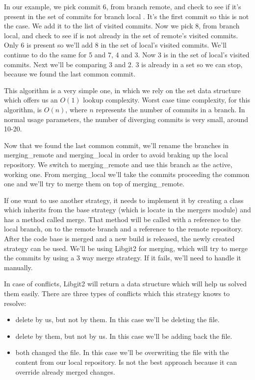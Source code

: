 In our example, we pick commit 6, from branch remote, and check to see if it's present in the set of commits for branch local . It's the first commit so this is not the case. We add it to the list of visited commits. Now we pick 8, from branch local, and check to see if is not already in the set of remote's  visited commits.
Only 6 is present so we'll add 8 in the set of local's visited commits. We'll continue to do the same for 5 and 7, 4 and 3. Now 3 is in the set of local's visited commits. Next we'll be comparing 3 and 2. 3 is already in a set so we can stop, because we found the last common commit.

This algorithm is a very simple one, in which we rely on the set data structure which offers us an $O(1)$ lookup complexity. Worst case time complexity, for this algorithm, is $O(n)$, where $n$ represents the number of commits in a branch. In normal usage parameters, the number of diverging commits is very small, around 10-20.

Now that we found the last common commit, we'll rename the branches in merging\_remote and merging\_local in order to avoid braking up the local repository. We switch to merging\_remote and use this branch as the active, working one. From merging\_local we'll take the commits proceeding the common one and we'll try to merge them on top of merging\_remote.

If one want to use another strategy, it needs to implement it by creating a class which inherits from the base strategy (which is locate in the mergers module) and has a method called merge. That method will be called with a reference to the local branch, on to the remote branch and a reference to the remote repository. After the code base is merged and a new build is released, the newly created strategy can be used. We'll be using Libgit2 for merging, which will try to merge the commits by using a 3 way merge strategy. If it fails, we'll need to handle it manually.

In case of conflicts, Libgit2 will return a data structure which will help us solved them easily. There are three types of conflicts which this strategy knows to resolve:
\begin{itemize}
    \item delete by us, but not by them. In this case we'll be deleting the file.
    \item delete by them, but not by us. In this case we'll be adding back the file.
    \item both changed the file. In this case we'll be overwriting the file with the content from our local repository. Is not the best approach because it can override already merged changes.
\end{itemize}

